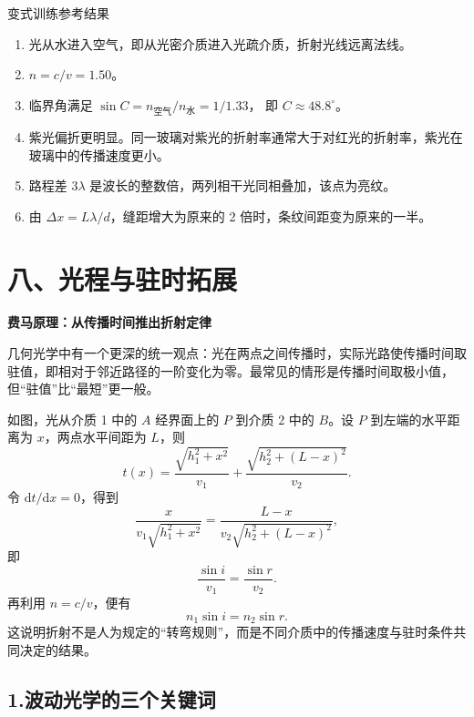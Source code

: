 \begin{learningbox}{变式训练参考结果}
\begin{enumerate}[itemsep=0.45em,topsep=0.3em,parsep=0pt]
  \item 光从水进入空气，即从光密介质进入光疏介质，折射光线远离法线。
  \item $n=c/v=1.50$。
  \item 临界角满足 $\sin C=n_{\text{空气}}/n_{\text{水}}=1/1.33$，
  即 $C\approx48.8^\circ$。
  \item 紫光偏折更明显。同一玻璃对紫光的折射率通常大于对红光的折射率，紫光在玻璃中的传播速度更小。
  \item 路程差 $3\lambda$ 是波长的整数倍，两列相干光同相叠加，该点为亮纹。
  \item 由 $\Delta x=L\lambda/d$，缝距增大为原来的 2 倍时，条纹间距变为原来的一半。
\end{enumerate}
\end{learningbox}

\section*{八、光程与驻时拓展}
\begin{competitionbox}
\textbf{费马原理：从传播时间推出折射定律}

几何光学中有一个更深的统一观点：光在两点之间传播时，实际光路使传播时间取驻值，即相对于邻近路径的一阶变化为零。最常见的情形是传播时间取极小值，但“驻值”比“最短”更一般。

\begin{center}


\label{fig:fermat-refraction-path}
\end{center}

如图，光从介质 1 中的 $A$ 经界面上的 $P$ 到介质 2 中的 $B$。设 $P$ 到左端的水平距离为 $x$，两点水平间距为 $L$，则
\[
t(x)=\frac{\sqrt{h_1^2+x^2}}{v_1}
+\frac{\sqrt{h_2^2+(L-x)^2}}{v_2}.
\]
令 $\mathrm{d}t/\mathrm{d}x=0$，得到
\[
\frac{x}{v_1\sqrt{h_1^2+x^2}}
=\frac{L-x}{v_2\sqrt{h_2^2+(L-x)^2}},
\]
即
\[
\frac{\sin i}{v_1}=\frac{\sin r}{v_2}.
\]
再利用 $n=c/v$，便有
\[
\boxed{n_1\sin i=n_2\sin r}.
\]
这说明折射不是人为规定的“转弯规则”，而是不同介质中的传播速度与驻时条件共同决定的结果。
\end{competitionbox}

\subsection*{1.\quad 波动光学的三个关键词}

